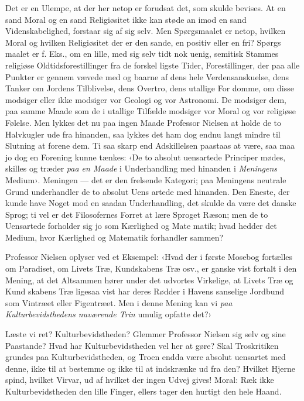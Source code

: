 \documentclass[12pt,a4paper,openany]{book}
\newcommand{\opage}[1]{\marginnote{\footnotesize\textit{[#1]}}}
\begin{document}
Det er en Ulempe, at der her netop er forudsat det, som
skulde bevises. At en sand Moral og en sand Religiøsitet ikke
kan støde an imod en sand Videnskabelighed, forstaar sig af
sig selv. Men Spørgsmaalet er netop, hvilken Moral og hvilken
Religiøsitet der er den sande, en positiv eller en fri? Spørgs\-%
maalet er f. Eks., om en lille, med sig selv tidt nok uenig,
semitisk Stammes religiøse Oldtidsforestillinger fra de forskel\-%
ligste Tider, Forestillinger, der paa alle Punkter er gennem\-%
vævede med og baarne af dens hele Verdensanskuelse, dens
Tanker om Jordens Tilblivelse, dens Overtro, dens utallige For\-%
domme, om disse modsiger eller ikke modsiger vor Geologi og
vor Astronomi. De modsiger dem, paa samme Maade som de
i utallige Tilfælde modsiger vor Moral og vor religiøse Følelse.
Men lykkes det nu paa ingen Maade Professor Nielsen at holde
de to Halvkugler ude fra hinanden, saa lykkes det ham dog
endnu langt mindre til Slutning at forene dem. Ti saa skarp
end Adskillelsen paastaas at være, saa maa jo dog en Forening
kunne tænkes: ‹De to absolut uensartede Principer mødes,
skilles og træder \emph{paa en Maade} i Underhandling med hinanden i
\emph{Meningens} Medium›. Meningen --- det er den frelsende Kategori;
paa Meningens neutrale Grund underhandler de to absolut Uens%
\opage{89}artede med hinanden. Den Eneste, der kunde have Noget mod
en saadan Underhandling, det skulde da være det danske Sprog;
ti vel er det Filosofernes Forret at lære Sproget Ræson;
men de to Uensartede forholder sig jo som Kærlighed og Mate\-%
matik; hvad hedder det Medium, hvor Kærlighed og Matematik
forhandler sammen?

Professor Nielsen oplyser ved et Eksempel: ‹Hvad der i første
Mosebog fortælles om Paradiset, om Livets Træ, Kundskabens
Træ osv., er ganske vist fortalt i den Mening, at det Altsammen
hører under det udvortes Virkelige, at Livets Træ og Kund\-%
skabens Træ ligesaa vist har deres Rødder i Havens sanselige
Jordbund som Vintræet eller Figentræet. Men i denne Mening
kan vi \emph{paa Kulturbevidsthedens nuværende Trin} umulig opfatte
det?›

Læste vi ret? Kulturbevidstheden? Glemmer Professor Nielsen
sig selv og sine Paastande? Hvad har Kulturbevidstheden vel
her at gøre? Skal Troskritiken grundes paa Kulturbevidstheden,
og Troen endda være absolut uensartet med denne, ikke til at
bestemme og ikke til at indskrænke ud fra den? Hvilket Hjerne\-%
spind, hvilket Virvar, ud af hvilket der ingen Udvej gives!
Moral: Ræk ikke Kulturbevidstheden den lille Finger, ellers
tager den hurtigt den hele Haand.
\end{document}
